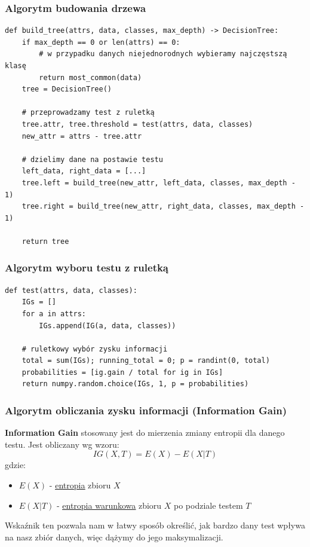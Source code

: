 \documentclass[11pt]{article}
\begin{document}
\subsubsection{Algorytm budowania drzewa}
\label{sec:org8d16fe2}
\begin{verbatim}
def build_tree(attrs, data, classes, max_depth) -> DecisionTree:
    if max_depth == 0 or len(attrs) == 0:
        # w przypadku danych niejednorodnych wybieramy najczęstszą klasę
        return most_common(data)
    tree = DecisionTree()
    
    # przeprowadzamy test z ruletką
    tree.attr, tree.threshold = test(attrs, data, classes)
    new_attr = attrs - tree.attr

    # dzielimy dane na postawie testu
    left_data, right_data = [...]
    tree.left = build_tree(new_attr, left_data, classes, max_depth - 1)
    tree.right = build_tree(new_attr, right_data, classes, max_depth - 1)

    return tree
\end{verbatim}
\subsubsection{Algorytm wyboru testu z ruletką}
\label{sec:orge6811b9}
\begin{verbatim}
def test(attrs, data, classes):
    IGs = []
    for a in attrs:
        IGs.append(IG(a, data, classes))

    # ruletkowy wybór zysku informacji
    total = sum(IGs); running_total = 0; p = randint(0, total)
    probabilities = [ig.gain / total for ig in IGs]
    return numpy.random.choice(IGs, 1, p = probabilities)
\end{verbatim}
\subsubsection{Algorytm obliczania zysku informacji (Information Gain)}
\label{sec:org5372fdc}
\textbf{Information Gain} stosowany jest do mierzenia zmiany entropii dla danego testu. Jest obliczany wg wzoru:
$$
IG(X,T) = E(X) - E(X|T)
$$
gdzie:
\begin{itemize}
\item $E(X)$ - \hyperref[ent]{\underline{entropia}} zbioru $X$
\item $E(X|T)$ - \hyperref[entwar]{\underline{entropia warunkowa}} zbioru $X$ po podziale testem $T$
\end{itemize}
Wskaźnik ten pozwala nam w łatwy sposób określić, jak bardzo dany test wpływa na nasz zbiór danych, więc dążymy do jego maksymalizacji.
\end{document}
